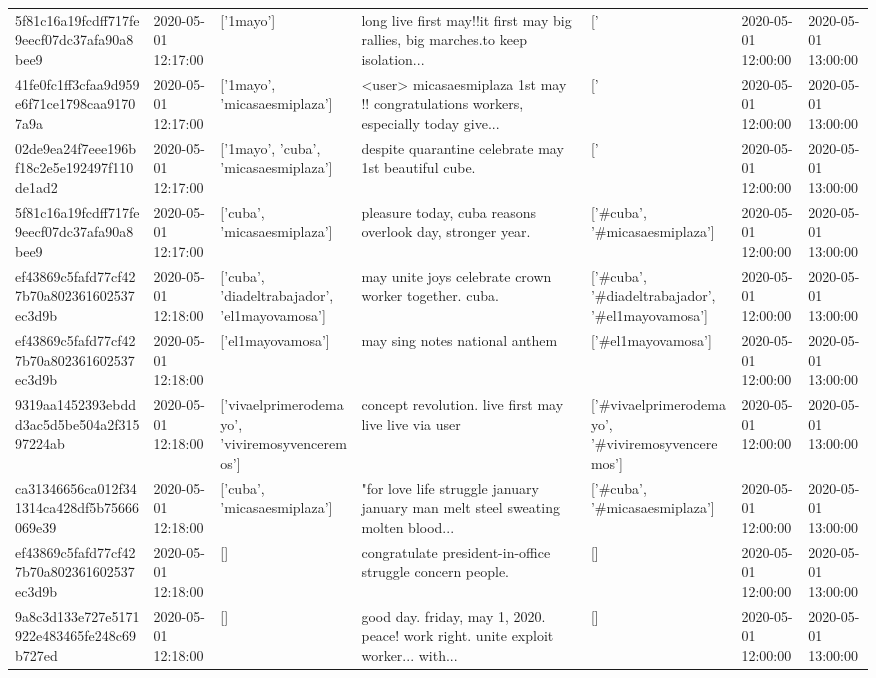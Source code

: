 \begin{tabular}{lllllll}
5f81c16a19fcdff717fe9eecf07dc37afa90a8bee9 & 2020-05-01 12:17:00 & ['1mayo'] & long live first may!!️it first may big rallies, big marches.to keep isolation... & ['#1mayo'] & 2020-05-01 12:00:00 & 2020-05-01 13:00:00 \\
41fe0fc1ff3cfaa9d959e6f71ce1798caa91707a9a & 2020-05-01 12:17:00 & ['1mayo', 'micasaesmiplaza'] & <user> micasaesmiplaza 1st may !!️ congratulations workers, especially today give... & ['#1mayo', '#micasaesmiplaza'] & 2020-05-01 12:00:00 & 2020-05-01 13:00:00 \\
02de9ea24f7eee196bf18c2e5e192497f110de1ad2 & 2020-05-01 12:17:00 & ['1mayo', 'cuba', 'micasaesmiplaza'] & despite quarantine celebrate may 1st beautiful cube. & ['#1mayo', '#cuba', '#micasaesmiplaza'] & 2020-05-01 12:00:00 & 2020-05-01 13:00:00 \\
5f81c16a19fcdff717fe9eecf07dc37afa90a8bee9 & 2020-05-01 12:17:00 & ['cuba', 'micasaesmiplaza'] & pleasure today, cuba reasons overlook day, stronger year. & ['#cuba', '#micasaesmiplaza'] & 2020-05-01 12:00:00 & 2020-05-01 13:00:00 \\
ef43869c5fafd77cf427b70a802361602537ec3d9b & 2020-05-01 12:18:00 & ['cuba', 'diadeltrabajador', 'el1mayovamosa'] & may unite joys celebrate crown worker together. cuba. & ['#cuba', '#diadeltrabajador', '#el1mayovamosa'] & 2020-05-01 12:00:00 & 2020-05-01 13:00:00 \\
ef43869c5fafd77cf427b70a802361602537ec3d9b & 2020-05-01 12:18:00 & ['el1mayovamosa'] & may sing notes national anthem & ['#el1mayovamosa'] & 2020-05-01 12:00:00 & 2020-05-01 13:00:00 \\
9319aa1452393ebddd3ac5d5be504a2f31597224ab & 2020-05-01 12:18:00 & ['vivaelprimerodemayo', 'viviremosyvenceremos'] & concept revolution. live first may live live via user & ['#vivaelprimerodemayo', '#viviremosyvenceremos'] & 2020-05-01 12:00:00 & 2020-05-01 13:00:00 \\
ca31346656ca012f341314ca428df5b75666069e39 & 2020-05-01 12:18:00 & ['cuba', 'micasaesmiplaza'] & "for love life struggle january january man melt steel sweating molten blood... & ['#cuba', '#micasaesmiplaza'] & 2020-05-01 12:00:00 & 2020-05-01 13:00:00 \\
ef43869c5fafd77cf427b70a802361602537ec3d9b & 2020-05-01 12:18:00 & [] & congratulate president-in-office struggle concern people. & [] & 2020-05-01 12:00:00 & 2020-05-01 13:00:00 \\
9a8c3d133e727e5171922e483465fe248c69b727ed & 2020-05-01 12:18:00 & [] & good day. friday, may 1, 2020. peace!️ work right. unite exploit worker... with... & [] & 2020-05-01 12:00:00 & 2020-05-01 13:00:00 \\

\end{tabular}
